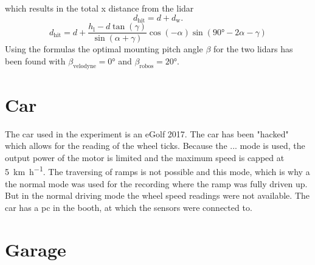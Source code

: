 which results in the total x distance from the \gls{lidar}
\begin{equation}
	d_\mathrm{hit} = d + d_\mathrm{w}.
\end{equation}
\begin{equation}
	d_\mathrm{hit} = d + \frac{h_\mathrm{l} - d\tan(\gamma)}{\sin(\alpha + \gamma)} \cos(-\alpha) \sin(\ang{90} - 2\alpha - \gamma)
\end{equation}
Using the formulas the optimal mounting pitch angle $\beta$ for the two \gls{lidar}s has been found with $\beta_\mathrm{velodyne} = \ang{0}$ and $\beta_\mathrm{robos} = \ang{20}$.


\section{Car}
The car used in the experiment is an eGolf 2017.
The car has been "hacked" which allows for the reading of the wheel ticks.
Because the ... mode is used, the output power of the motor is limited and the maximum speed is capped at \SI{5}{\kilo\metre\per\hour}.
The traversing of ramps is not possible and this mode, which is why a the normal mode was used for the recording where the ramp was fully driven up.
But in the normal driving mode the wheel speed readings were not available.
The car has a pc in the booth, at which the sensors were connected to.



\section{Garage}
